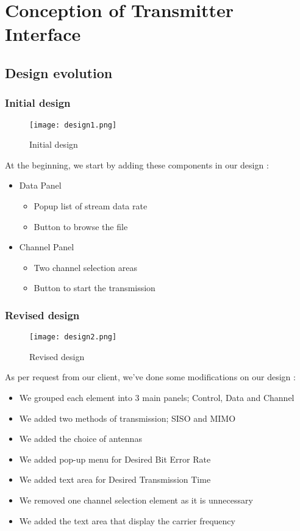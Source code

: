 \section{Conception of Transmitter Interface}

\subsection{Design evolution}

\subsubsection{Initial design}
\begin{figure}[h!]
  \centering
    \texttt{[image: design1.png]}
  \caption{Initial design}
  \label{fig:design1 }
\end{figure}
\par At the beginning, we start by adding these components in our design :
\begin{itemize}
	\item Data Panel
	\begin{itemize}
		\item Popup list of stream data rate 
		\item Button to browse the file
	\end{itemize}
	\item Channel Panel
	\begin{itemize}
		\item Two channel selection areas 
		\item Button to start the transmission
	\end{itemize}
\end{itemize}

\clearpage
\subsubsection{Revised design}
\begin{figure}[ht]
  \centering
    \texttt{[image: design2.png]}
  \caption{Revised design}
  \label{fig:design2 }
\end{figure}
\par As per request from our client, we've done some modifications on our design :
\begin{itemize}
	\item We grouped each element into 3 main panels; Control, Data and Channel
	\item We added two methods of transmission; SISO and MIMO
	\item We added the choice of antennas
	\item We added pop-up menu for Desired Bit Error Rate
	\item We added text area for Desired Transmission Time
	\item We removed one channel selection element as it is unnecessary
	\item We added the text area that display the carrier frequency
\end{itemize}

